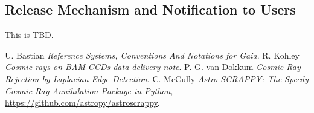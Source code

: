 \documentclass[a4paper, 11pt]{article}
\begin{document}
\subsection{Release Mechanism and Notification to Users}

This is TBD.


\begin{thebibliography}{9}
 U. Bastian \emph{Reference Systems, Conventions And Notations for Gaia}.
 R. Kohley \emph{Cosmic rays on BAM CCDs data delivery note}.
 P. G. van Dokkum \emph{Cosmic-Ray Rejection by Laplacian Edge Detection}.
 C. McCully \emph{Astro-SCRAPPY: The Speedy Cosmic Ray Annihilation Package in Python}, \url{https://github.com/astropy/astroscrappy}.


\end{thebibliography}
\end{document}
